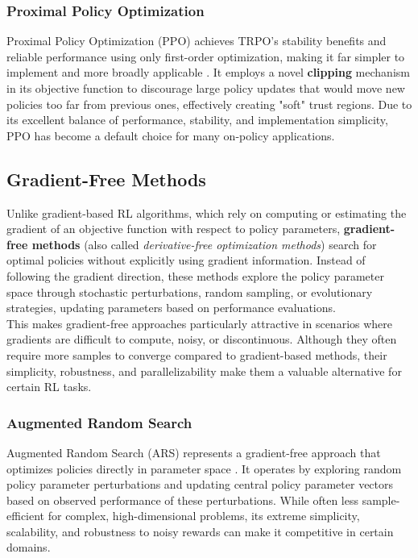 \subsubsection{Proximal Policy Optimization}

Proximal Policy Optimization (PPO) achieves TRPO's stability benefits and reliable performance using only first-order optimization, making it far simpler to implement and more broadly applicable \cite{schulman2017proximal}. It employs a novel \textbf{clipping} mechanism in its objective function to discourage large policy updates that would move new policies too far from previous ones, effectively creating "soft" trust regions. Due to its excellent balance of performance, stability, and implementation simplicity, PPO has become a default choice for many on-policy applications.

\subsection{Gradient-Free Methods}
Unlike gradient-based RL algorithms, which rely on computing or estimating the gradient of an objective function with respect to policy parameters, \textbf{gradient-free methods} (also called \textit{derivative-free optimization methods}) search for optimal policies without explicitly using gradient information. 
Instead of following the gradient direction, these methods explore the policy parameter space through stochastic perturbations, random sampling, or evolutionary strategies, updating parameters based on performance evaluations. 
\\
\noindent
This makes gradient-free approaches particularly attractive in scenarios where gradients are difficult to compute, noisy, or discontinuous. Although they often require more samples to converge compared to gradient-based methods, their simplicity, robustness, and parallelizability make them a valuable alternative for certain RL tasks.

\subsubsection{Augmented Random Search}

Augmented Random Search (ARS) represents a gradient-free approach that optimizes policies directly in parameter space \cite{mania2018simple}. It operates by exploring random policy parameter perturbations and updating central policy parameter vectors based on observed performance of these perturbations. While often less sample-efficient for complex, high-dimensional problems, its extreme simplicity, scalability, and robustness to noisy rewards can make it competitive in certain domains.
